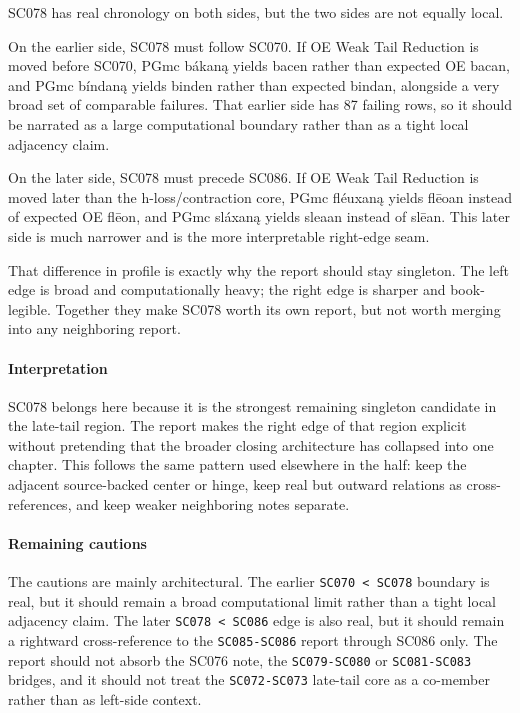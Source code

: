 \documentclass[
  british,
  a4paper,
]{article}
\begin{document}
SC078 has real chronology on both sides, but the two sides are not
equally local.

On the earlier side, SC078 must follow SC070. If OE Weak Tail Reduction
is moved before SC070, PGmc bákaną yields bacen rather than expected OE
bacan, and PGmc bíndaną yields binden rather than expected bindan,
alongside a very broad set of comparable failures. That earlier side has
87 failing rows, so it should be narrated as a large computational
boundary rather than as a tight local adjacency claim.

On the later side, SC078 must precede SC086. If OE Weak Tail Reduction
is moved later than the h-loss/contraction core, PGmc fléuxaną yields
flēoan instead of expected OE flēon, and PGmc sláxaną yields sleaan
instead of slēan. This later side is much narrower and is the more
interpretable right-edge seam.

That difference in profile is exactly why the report should stay
singleton. The left edge is broad and computationally heavy; the right
edge is sharper and book-legible. Together they make SC078 worth its own
report, but not worth merging into any neighboring report.

\paragraph{Interpretation}\label{interpretation-48}

SC078 belongs here because it is the strongest remaining singleton
candidate in the late-tail region. The report makes the right edge of
that region explicit without pretending that the broader closing
architecture has collapsed into one chapter. This follows the same
pattern used elsewhere in the half: keep the adjacent source-backed
center or hinge, keep real but outward relations as cross-references,
and keep weaker neighboring notes separate.

\paragraph{Remaining cautions}\label{remaining-cautions-48}

The cautions are mainly architectural. The earlier
\texttt{SC070\ \textless{}\ SC078} boundary is real, but it should
remain a broad computational limit rather than a tight local adjacency
claim. The later \texttt{SC078\ \textless{}\ SC086} edge is also real,
but it should remain a rightward cross-reference to the
\texttt{SC085-SC086} report through SC086 only. The report should not
absorb the SC076 note, the \texttt{SC079-SC080} or \texttt{SC081-SC083}
bridges, and it should not treat the \texttt{SC072-SC073} late-tail core
as a co-member rather than as left-side context.
\end{document}

